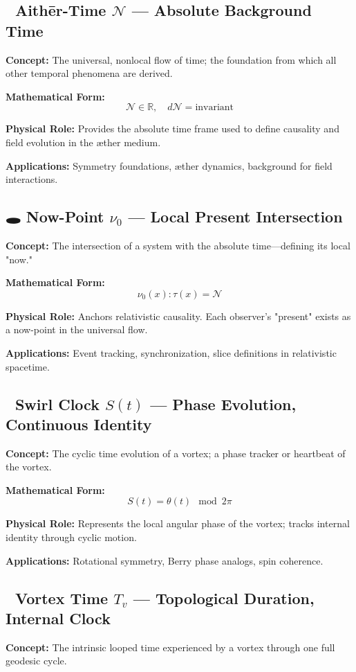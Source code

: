 \documentclass[a4paper,12pt]{article}
\begin{document}
    \subsection*{🌌 Aithēr-Time $\mathcal{N}$ — Absolute Background Time}
    \textbf{Concept:} The universal, nonlocal flow of time; the foundation from which all other temporal phenomena are derived.

    \textbf{Mathematical Form:}
    \[
        \mathcal{N} \in \mathbb{R}, \quad d\mathcal{N} = \text{invariant}
    \]

    \textbf{Physical Role:} Provides the absolute time frame used to define causality and field evolution in the æther medium.

    \textbf{Applications:} Symmetry foundations, æther dynamics, background for field interactions.

    \subsection*{🕳️ Now-Point $\nu_0$ — Local Present Intersection}
    \textbf{Concept:} The intersection of a system with the absolute time—defining its local "now."

    \textbf{Mathematical Form:}
    \[
        \nu_0(x) : \tau(x) = \mathcal{N}
    \]

    \textbf{Physical Role:} Anchors relativistic causality. Each observer's "present" exists as a now-point in the universal flow.

    \textbf{Applications:} Event tracking, synchronization, slice definitions in relativistic spacetime.

    \subsection*{🔁 Swirl Clock $S(t)$ — Phase Evolution, Continuous Identity}
    \textbf{Concept:} The cyclic time evolution of a vortex; a phase tracker or heartbeat of the vortex.

    \textbf{Mathematical Form:}
    \[
        S(t) = \theta(t) \mod 2\pi
    \]

    \textbf{Physical Role:} Represents the local angular phase of the vortex; tracks internal identity through cyclic motion.

    \textbf{Applications:} Rotational symmetry, Berry phase analogs, spin coherence.

    \subsection*{🔄 Vortex Time $T_v$ — Topological Duration, Internal Clock}
    \textbf{Concept:} The intrinsic looped time experienced by a vortex through one full geodesic cycle.
\end{document}
